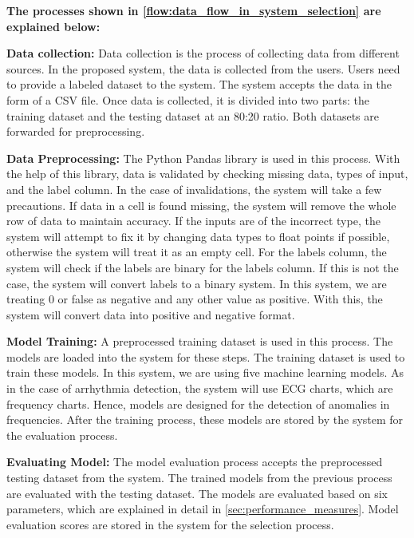 \textbf{The processes shown in \cref{flow:data_flow_in_system_selection} are explained below:}

\vspace{-0.5em}
\textbf{Data collection:}
Data collection is the process of collecting data from different sources. In the proposed system, the data is collected from the users. Users need to provide a labeled dataset to the system. The system accepts the data in the form of a CSV file. Once data is collected, it is divided into two parts: the training dataset and the testing dataset at an 80:20 ratio. Both datasets are forwarded for preprocessing.

\vspace{-0.5em}
\textbf{Data Preprocessing:}
The Python Pandas library is used in this process. With the help of this library, data is validated by checking missing data, types of input, and the label column. In the case of invalidations, the system will take a few precautions. If data in a cell is found missing, the system will remove the whole row of data to maintain accuracy. If the inputs are of the incorrect type, the system will attempt to fix it by changing data types to float points if possible, otherwise the system will treat it as an empty cell. For the labels column, the system will check if the labels are binary for the labels column. If this is not the case, the system will convert labels to a binary system. In this system, we are treating 0 or false as negative and any other value as positive. With this, the system will convert data into positive and negative format.

\vspace{-0.5em}
\textbf{Model Training:}
A preprocessed training dataset is used in this process. The models are loaded into the system for these steps. The training dataset is used to train these models. In this system, we are using five machine learning models. As in the case of arrhythmia detection, the system will use ECG charts, which are frequency charts. Hence, models are designed for the detection of anomalies in frequencies. After the training process, these models are stored by the system for the evaluation process.

\vspace{-0.5em}
\textbf{Evaluating Model:}
The model evaluation process accepts the preprocessed testing dataset from the system. The trained models from the previous process are evaluated with the testing dataset. The models are evaluated based on six parameters, which are explained in detail in \cref{sec:performance_measures}. Model evaluation scores are stored in the system for the selection process.

